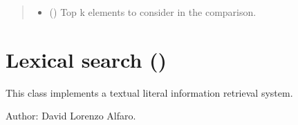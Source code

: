 \documentclass[letterpaper,10pt,english]{sphinxmanual}
\begin{document}
\begin{fulllineitems}
\begin{fulllineitems}
\begin{quote}
\begin{description}
\begin{itemize}
\item {} 
 (\sphinxstyleliteralemphasis{\sphinxupquote{, }}) \textendash{} Top k elements to consider in the comparison.

\end{itemize}

\end{description}\end{quote}

\end{fulllineitems}


\end{fulllineitems}



\chapter{Lexical search ()}
\label{\detokenize{code:module-lexical_search}}\label{\detokenize{code:lexical-search-lexical-search-py}}
This class implements a textual literal information retrieval system.

Author: David Lorenzo Alfaro.
\end{document}
